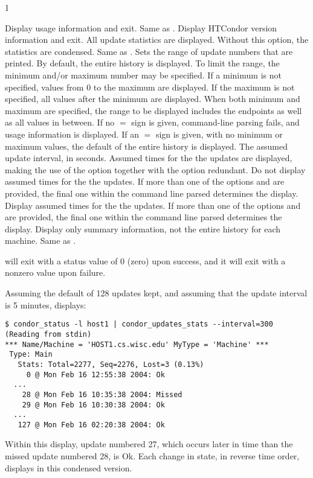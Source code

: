 \begin{ManPage}{\label{man-condor-updates-stats}}{1}
\begin{Options}
    {Display usage information and exit. }
    {Same as .  }
    {Display HTCondor version information and exit. }
    {All update statistics are displayed.
    Without this option, the statistics are condensed.}
    {Same as .  }
   {Sets the
    range of update numbers that
    are printed.  By default, the entire history is displayed.
    To limit the range, the minimum and/or maximum
    number may be specified.
    If a minimum is not specified, values from 0 to the maximum
    are displayed.
    If the maximum is not specified, all values after the minimum
    are displayed.
    When both minimum and maximum are specified, the range
    to be displayed includes the endpoints as well as all
    values in between.
    If no $=$ sign is given, command-line parsing fails,
    and usage information is displayed.
    If an  $=$ sign is given, with no minimum or maximum values,
    the default of the entire history is displayed.}
   {The assumed update
    interval, in seconds.
    Assumed times for the the updates are displayed, making the
    use of the  option together with 
    the  option redundant.}
   {Do not display assumed times for the
    the updates.
    If more than one of the options  and 
    are provided, the final one within the command line parsed
    determines the display.  }
   {Display assumed times for the the updates.
    If more than one of the options  and 
    are provided, the final one within the command line parsed
    determines the display.  }
   {Display only summary
    information, not the entire history for each machine.  }
    {Same as .  }
\end{Options}

\ExitStatus

 will exit with a status value of 0 (zero) upon success,
and it will exit with a nonzero value upon failure.

\Examples
Assuming the default of 128 updates kept, 
and assuming that the update interval is 5 minutes,
 displays: 
\footnotesize
\begin{verbatim}
$ condor_status -l host1 | condor_updates_stats --interval=300
(Reading from stdin)
*** Name/Machine = 'HOST1.cs.wisc.edu' MyType = 'Machine' ***
 Type: Main
   Stats: Total=2277, Seq=2276, Lost=3 (0.13%)
     0 @ Mon Feb 16 12:55:38 2004: Ok
  ...
    28 @ Mon Feb 16 10:35:38 2004: Missed
    29 @ Mon Feb 16 10:30:38 2004: Ok
  ...
   127 @ Mon Feb 16 02:20:38 2004: Ok
\end{verbatim}
\normalsize

Within this display, update numbered 27, which occurs later in time
than the missed update numbered 28, is Ok.
Each change in state, in reverse time order, displays in this
condensed version.
\normalsize


\end{ManPage}
